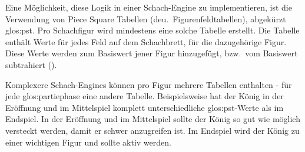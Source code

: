 Eine Möglichkeit, diese Logik in einer Schach-Engine zu implementieren, ist die Verwendung von Piece Square Tabellen (deu.\ Figurenfeldtabellen), abgekürzt \gls{glos:pst}.
Pro Schachfigur wird mindestens eine solche Tabelle erstellt.
Die Tabelle enthält Werte für jedes Feld auf dem Schachbrett, für die dazugehörige Figur.
Diese Werte werden zum Basiswert jener Figur hinzugefügt, bzw.\ vom Basiswert subtrahiert (\cite{piecesquaretable}).

Komplexere Schach-Engines können pro Figur mehrere Tabellen enthalten - für jede \gls{glos:partiephase} eine andere Tabelle.
Beispielsweise hat der König in der Eröffnung und im Mittelspiel komplett unterschiedliche \gls{glos:pst}-Werte als im Endspiel.
In der Eröffnung und im Mittelspiel sollte der König so gut wie möglich versteckt werden, damit er schwer anzugreifen ist.
Im Endspiel wird der König zu einer wichtigen Figur und sollte aktiv werden.

